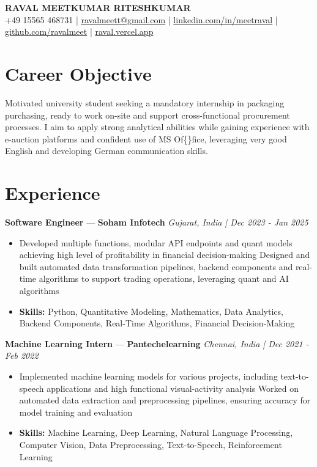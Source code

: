 \documentclass[a4paper,10pt]{article}
\begin{document}
\begin{center}
  {\Large\bfseries RAVAL MEETKUMAR RITESHKUMAR}\\[2pt]
  {\small +49 15565 468731 \;|\; \href{mailto:ravalmeett@gmail.com}{ravalmeett@gmail.com} \;|\; \href{https://www.linkedin.com/in/meetraval/}{linkedin.com/in/meetraval} \;|\; \href{https://github.com/ravalmeet}{github.com/ravalmeet} \;|\; \href{https://raval.vercel.app/}{raval.vercel.app}}
\end{center}
\vspace{-3pt}

\section*{Career Objective}
Motivated university student seeking a mandatory internship in packaging purchasing, ready to work on-site and support cross-functional procurement processes. I aim to apply strong analytical abilities while gaining experience with e-auction platforms and confident use of MS Of\{\}fice, leveraging very good English and developing German communication skills.\par

\section*{Experience}
\textbf{Software Engineer} — \textbf{Soham Infotech} \hfill \textit{Gujarat, India \;|\; Dec 2023 - Jan 2025}\par
\vspace{1pt}
\begin{itemize}
  \item Developed multiple functions, modular API endpoints and quant models achieving high level of profitability in financial decision-making Designed and built automated data transformation pipelines, backend components and real-time algorithms to support trading operations, leveraging quant and AI algorithms
  \item \textbf{Skills:} Python, Quantitative Modeling, Mathematics, Data Analytics, Backend Components, Real-Time Algorithms, Financial Decision-Making
\end{itemize}
\vspace{3pt}
\textbf{Machine Learning Intern} — \textbf{Pantechelearning} \hfill \textit{Chennai, India \;|\; Dec 2021 - Feb 2022}\par
\vspace{1pt}
\begin{itemize}
  \item Implemented machine learning models for various projects, including text-to-speech applications and high functional visual-activity analysis Worked on automated data extraction and preprocessing pipelines, ensuring accuracy for model training and evaluation
  \item \textbf{Skills:} Machine Learning, Deep Learning, Natural Language Processing, Computer Vision, Data Preprocessing, Text-to-Speech, Reinforcement Learning
\end{itemize}
\end{document}
